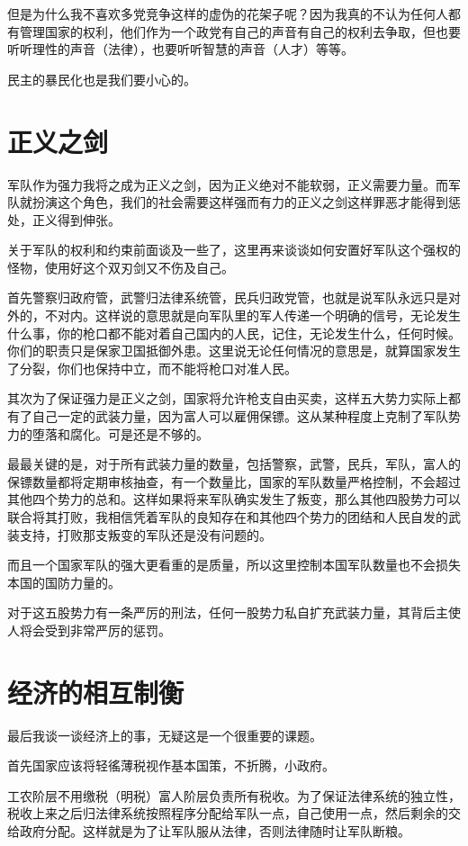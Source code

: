 \documentclass[11pt,oneside]{article}
\begin{document}
但是为什么我不喜欢多党竞争这样的虚伪的花架子呢？因为我真的不认为任何人都有管理国家的权利，他们作为一个政党有自己的声音有自己的权利去争取，但也要听听理性的声音（法律），也要听听智慧的声音（人才）等等。

民主的暴民化也是我们要小心的。


\section{正义之剑}
\label{sec-6}
军队作为强力我将之成为正义之剑，因为正义绝对不能软弱，正义需要力量。而军队就扮演这个角色，我们的社会需要这样强而有力的正义之剑这样罪恶才能得到惩处，正义得到伸张。

关于军队的权利和约束前面谈及一些了，这里再来谈谈如何安置好军队这个强权的怪物，使用好这个双刃剑又不伤及自己。

首先警察归政府管，武警归法律系统管，民兵归政党管，也就是说军队永远只是对外的，不对内。这样说的意思就是向军队里的军人传递一个明确的信号，无论发生什么事，你的枪口都不能对着自己国内的人民，记住，无论发生什么，任何时候。你们的职责只是保家卫国抵御外患。这里说无论任何情况的意思是，就算国家发生了分裂，你们也保持中立，而不能将枪口对准人民。

其次为了保证强力是正义之剑，国家将允许枪支自由买卖，这样五大势力实际上都有了自己一定的武装力量，因为富人可以雇佣保镖。这从某种程度上克制了军队势力的堕落和腐化。可是还是不够的。


最最关键的是，对于所有武装力量的数量，包括警察，武警，民兵，军队，富人的保镖数量都将定期审核抽查，有一个数量比，国家的军队数量严格控制，不会超过其他四个势力的总和。这样如果将来军队确实发生了叛变，那么其他四股势力可以联合将其打败，我相信凭着军队的良知存在和其他四个势力的团结和人民自发的武装支持，打败那支叛变的军队还是没有问题的。

而且一个国家军队的强大更看重的是质量，所以这里控制本国军队数量也不会损失本国的国防力量的。

对于这五股势力有一条严厉的刑法，任何一股势力私自扩充武装力量，其背后主使人将会受到非常严厉的惩罚。


\section{经济的相互制衡}
\label{sec-7}
最后我谈一谈经济上的事，无疑这是一个很重要的课题。

首先国家应该将轻徭薄税视作基本国策，不折腾，小政府。

工农阶层不用缴税（明税）富人阶层负责所有税收。为了保证法律系统的独立性，税收上来之后归法律系统按照程序分配给军队一点，自己使用一点，然后剩余的交给政府分配。这样就是为了让军队服从法律，否则法律随时让军队断粮。
\end{document}
